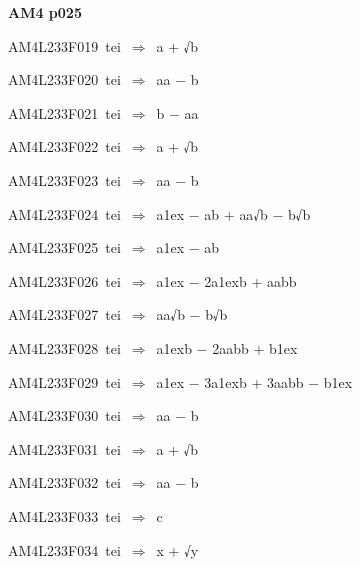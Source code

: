\par\vfill\eject
{\bf\hfill AM4 p025\hfill\hbox{}}\par\bigskip
{\sixrm AM4L233F019\ {\sixit tei}\ }$\Rightarrow$\ {\tenit a} + √{\tenit b}\par\smallskip
{\sixrm AM4L233F020\ {\sixit tei}\ }$\Rightarrow$\ {\tenit aa} − {\tenit b}\par\smallskip
{\sixrm AM4L233F021\ {\sixit tei}\ }$\Rightarrow$\ {\tenit b} − {\tenit aa}\par\smallskip
{\sixrm AM4L233F022\ {\sixit tei}\ }$\Rightarrow$\ {\tenit a} + √{\tenit b}\par\smallskip
{\sixrm AM4L233F023\ {\sixit tei}\ }$\Rightarrow$\ {\tenit aa} − {\tenit b}\par\smallskip
{\sixrm AM4L233F024\ {\sixit tei}\ }$\Rightarrow$\ {\tenit a}\raise1ex\hbox{} − {\tenit ab} + {\tenit aa}√{\tenit b} − {\tenit b}√{\tenit b}\par\smallskip
{\sixrm AM4L233F025\ {\sixit tei}\ }$\Rightarrow$\ {\tenit a}\raise1ex\hbox{} − {\tenit ab}\par\smallskip
{\sixrm AM4L233F026\ {\sixit tei}\ }$\Rightarrow$\ {\tenit a}\raise1ex\hbox{} − 2{\tenit a}\raise1ex\hbox{}{\tenit b} + {\tenit aabb}\par\smallskip
{\sixrm AM4L233F027\ {\sixit tei}\ }$\Rightarrow$\ {\tenit aa}√{\tenit b} − {\tenit b}√{\tenit b}\par\smallskip
{\sixrm AM4L233F028\ {\sixit tei}\ }$\Rightarrow$\ {\tenit a}\raise1ex\hbox{}{\tenit b} − 2{\tenit aabb} + {\tenit b}\raise1ex\hbox{}\par\smallskip
{\sixrm AM4L233F029\ {\sixit tei}\ }$\Rightarrow$\ {\tenit a}\raise1ex\hbox{} − 3{\tenit a}\raise1ex\hbox{}{\tenit b} + 3{\tenit aabb} − {\tenit b}\raise1ex\hbox{}\par\smallskip
{\sixrm AM4L233F030\ {\sixit tei}\ }$\Rightarrow$\ {\tenit aa} − {\tenit b}\par\smallskip
{\sixrm AM4L233F031\ {\sixit tei}\ }$\Rightarrow$\ {\tenit a} + √{\tenit b}\par\smallskip
{\sixrm AM4L233F032\ {\sixit tei}\ }$\Rightarrow$\ {\tenit aa} − {\tenit b}\par\smallskip
{\sixrm AM4L233F033\ {\sixit tei}\ }$\Rightarrow$\ {\tenit c}\par\smallskip
{\sixrm AM4L233F034\ {\sixit tei}\ }$\Rightarrow$\ {\tenit x} + √{\tenit y}\par\smallskip
